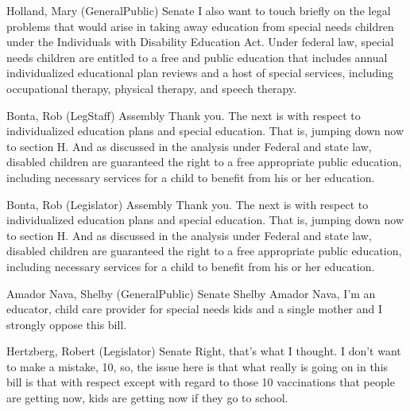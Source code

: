 \begin{result}{12.771668141654398}{Holland, Mary (GeneralPublic) Senate}
I also want to touch briefly on the legal problems that would arise in taking away education from special needs children under the Individuals with Disability Education Act. Under federal law, special needs children are entitled to a free and public education that includes annual individualized educational plan reviews and a host of special services, including occupational therapy, physical therapy, and speech therapy.
\end{result}

\begin{result}{11.435643821597985}{Bonta, Rob (LegStaff) Assembly}
Thank you. The next is with respect to individualized education plans and special education. That is, jumping down now to section H. And as discussed in the analysis under Federal and state law, disabled children are guaranteed the right to a free appropriate public education, including necessary services for a child to benefit from his or her education.
\end{result}

\begin{result}{11.435643821597985}{Bonta, Rob (Legislator) Assembly}
Thank you. The next is with respect to individualized education plans and special education. That is, jumping down now to section H. And as discussed in the analysis under Federal and state law, disabled children are guaranteed the right to a free appropriate public education, including necessary services for a child to benefit from his or her education.
\end{result}

\begin{result}{10.608660701613644}{Amador Nava, Shelby (GeneralPublic) Senate}
Shelby Amador Nava, I'm an educator, child care provider for special needs kids and a single mother and I strongly oppose this bill.
\end{result}

\begin{result}{10.583681489764441}{Hertzberg, Robert (Legislator) Senate}
Right, that's what I thought. I don't want to make a mistake, 10, so, the issue here is that what really is going on in this bill is that with respect except with regard to those 10 vaccinations that people are getting now, kids are getting now if they go to school.
\end{result}

